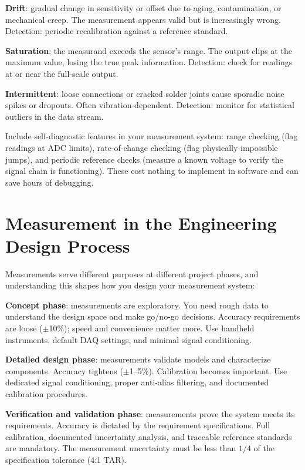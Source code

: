 \documentclass[11pt,letterpaper,twoside,openany]{book}
\begin{document}
\textbf{Drift}: gradual change in sensitivity or offset due to aging, contamination, or mechanical creep. The measurement appears valid but is increasingly wrong. Detection: periodic recalibration against a reference standard.

\textbf{Saturation}: the measurand exceeds the sensor's range. The output clips at the maximum value, losing the true peak information. Detection: check for readings at or near the full-scale output.

\textbf{Intermittent}: loose connections or cracked solder joints cause sporadic noise spikes or dropouts. Often vibration-dependent. Detection: monitor for statistical outliers in the data stream.

\begin{tipbox}
Include self-diagnostic features in your measurement system: range checking (flag readings at ADC limits), rate-of-change checking (flag physically impossible jumps), and periodic reference checks (measure a known voltage to verify the signal chain is functioning). These cost nothing to implement in software and can save hours of debugging.
\end{tipbox}
\section{Measurement in the Engineering Design Process}
Measurements serve different purposes at different project phases, and understanding this shapes how you design your measurement system:

\textbf{Concept phase}: measurements are exploratory. You need rough data to understand the design space and make go/no-go decisions. Accuracy requirements are loose ($\pm$10\%); speed and convenience matter more. Use handheld instruments, default DAQ settings, and minimal signal conditioning.

\textbf{Detailed design phase}: measurements validate models and characterize components. Accuracy tightens ($\pm$1--5\%). Calibration becomes important. Use dedicated signal conditioning, proper anti-alias filtering, and documented calibration procedures.

\textbf{Verification and validation phase}: measurements prove the system meets its requirements. Accuracy is dictated by the requirement specifications. Full calibration, documented uncertainty analysis, and traceable reference standards are mandatory. The measurement uncertainty must be less than $1/4$ of the specification tolerance (4:1 TAR).
\end{document}
